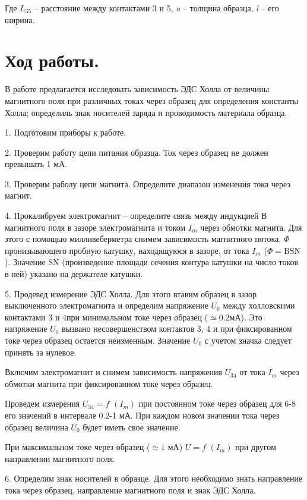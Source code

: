 \documentclass[a4paper,12pt]{article} %
\begin{document}
Где $L_{35}$ -- расстояние между контактами 3 и 5, \textit{a} -- толщина образца, \textit{l} -- его ширина.

\section{Ход работы.}

В работе предлагается исследовать зависимость ЭДС Холла от величины магнитного поля при различных токах через образец для определения константы Холла; определиль знак носителей заряда и проводимость материала образца.

1. Подготовим приборы к работе.

2. Проверим работу цепи питания образца. Ток через образец не должен
превышать 1 мА.

3. Проверим раболу цепи магнита. Определите диапазон изменения тока через магнит.

4. Прокалибруем электромагнит -- определите связь между индукцией В магнитного поля в зазоре электромагнита и током $I_m$ через обмотки магнита. Для этого с помощью милливеберметра снимем зависимость магнитного потока, $\Phi$ пронизывающего пробную катушку, находящуюся в зазоре, от тока $I_m$ ($\Phi = \text{BSN}$). Значение SN (произведение площади сечения контура катушки на число токов в ней) указано на держателе катушки.

5. Продевед измерение ЭДС Холла. Для этого втавим образец в зазор выключенного электромагнита и определим напряжение $U_0$ между холловскими контактами 3 и 4при минимальном токе через образец ($\simeq 0.2 \text{мА}$). Это напряжение $U_0$ вызвано несовершенством контактов 3, 4 и при фиксированном токе через образец остается неизменным. Значение $U_0$ с учетом значка следует принять за нулевое.

Включим электромагнит и снимем зависимость напряжения $U_{34}$ от тока $I_m$ через обмотки магнита при фиксированном токе через образец.

Проведем измерения $U_{34} = \textit{f }(I_m)$ при постоянном токе через образец для 6-8 его значений в интервале 0.2-1 мА. При каждом новом значении тока через образец величина $U_0$ будет иметь свое значение.

При максимальном токе через образец ($\simeq 1$ мА) $U = \textit{f }(I_m)$ при другом направлении магнитного поля.

6. Определим знак носителей в образце. Для этого необходимо знать направление тока через образец, направление магнитного поля и знак ЭДС Холла.
\end{document}
